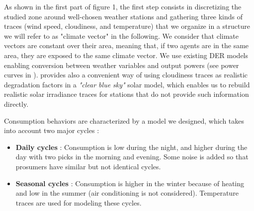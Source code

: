 \documentclass[conference]{IEEEtran}
\begin{document}
As shown in the first part of figure 1, the first step consists in discretizing the studied zone around well-chosen weather stations and gathering three kinds of traces (wind speed, cloudiness, and temperature) that we organize in a structure we will refer to as "climate vector" in the following. We consider that climate vectors are constant over their area, meaning that, if two agents are in the same area, they are exposed to the same climate vector. We use existing DER models enabling conversion between weather variables and output powers (see power curves in \cite{Kota2011} \cite{windturbinemodel}). \cite{Dans2007} provides also a convenient way of using cloudiness traces as realistic degradation factors in a \textit{"clear blue sky"} solar model, which enables us to rebuild realistic solar irradiance traces for stations that do not provide such information directly.

Consumption behaviors are characterized by a model we designed, which takes into account two major cycles : 

\begin{itemize}
\item \textbf{Daily cycles} : Consumption is low during the night, and higher during the day with two picks in the morning and evening. Some noise is added so that prosumers have similar but not identical cycles.
\item \textbf{Seasonal cycles} : Consumption is higher in the winter because of heating and low in the summer (air conditioning is not considered). Temperature traces are used for modeling these cycles.
\end{itemize} 
\end{document}
